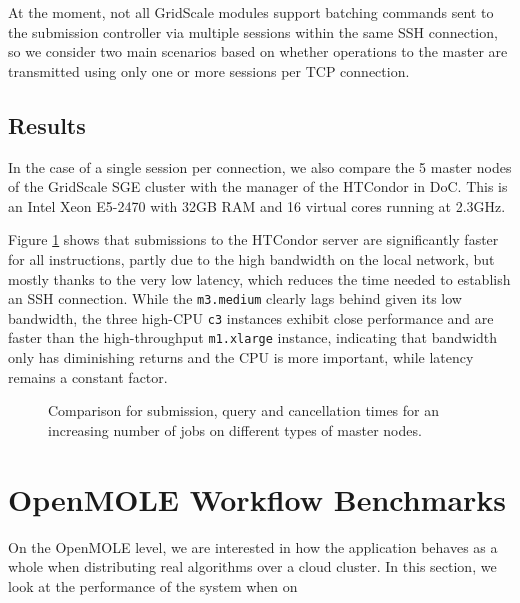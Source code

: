 At the moment, not all GridScale modules support batching commands sent to the submission controller via multiple sessions within the same SSH connection, so we consider two main scenarios based on whether operations to the master are transmitted using only one or more sessions per TCP connection.

\subsection{Results}

In the case of a single session per connection, we also compare the 5 master nodes of the GridScale SGE cluster with the manager of the HTCondor in DoC. This is an Intel Xeon E5-2470 with 32GB RAM and 16 virtual cores running at 2.3GHz.

Figure \ref{SingleSession} shows that submissions to the HTCondor server are significantly faster for all instructions, partly due to the high bandwidth on the local network, but mostly thanks to the very low latency, which reduces the time needed to establish an SSH connection. While the \verb|m3.medium| clearly lags behind given its low bandwidth, the three high-CPU \verb|c3| instances exhibit close performance and are faster than the high-throughput \verb|m1.xlarge| instance, indicating that bandwidth only has diminishing returns and the CPU is more important, while latency remains a constant factor.

\begin{figure}[H]
	\centering
	\endminipage \vfill
	\endminipage \hfill
	\endminipage \hfill
	\caption{Comparison for submission, query and cancellation times for an increasing number of jobs on different types of master nodes.}
	\label{SingleSession}
\end{figure}

\section{OpenMOLE Workflow Benchmarks}

On the OpenMOLE level, we are interested in how the application behaves as a whole when distributing real algorithms over a cloud cluster. In this section, we look at the performance of the system when on

